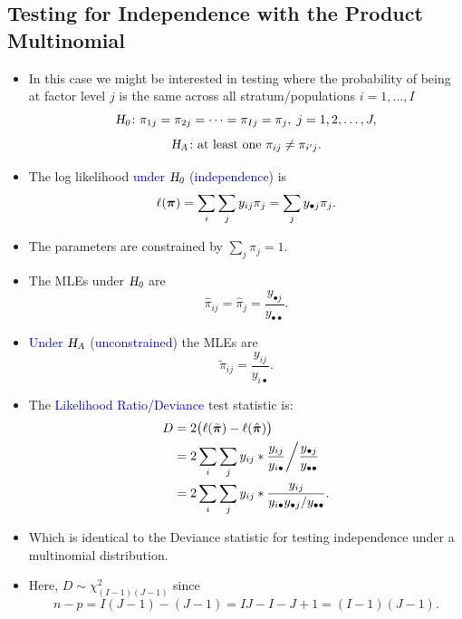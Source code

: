\documentclass{article}\usepackage[]{graphicx}\usepackage[svgnames]{xcolor}
\let\log\relax%
\newcommand{\HN}{\textsl{H}_{\textsl{0}}}%
\newcommand{\HA}{\textsl{H}_{\textsl{A}}}%
\providecommand{\Vector}[1]{\bm{#1}}%
\begin{document}
\subsection*{Testing for Independence with the Product Multinomial}
\begin{itemize}
      \item In this case we might be interested in testing where the probability of being at
            factor level $j$ is the same across all stratum/populations $ i=1,\ldots,I $
            \[ \HN\colon \pi_{1j}=\pi_{2j}=\cdots=\pi_{Ij}=\pi_j,\;j=1,2,\ldots,J, \]
            \[ \HA\colon \text{at least one }\pi_{ij}\ne \pi_{i^\prime j}. \]
      \item The log likelihood \textcolor{Blue}{under $ \HN $ (independence)} is
            \[ \ell(\Vector{\pi})=\sum_i\sum_j y_{ij}\log{\pi_{j}}=\sum_j y_{\bullet j}\log{\pi_{j}}. \]
      \item The parameters are constrained by $ \sum_{j}\pi_j=1 $.
      \item The MLEs under $ \HN $ are
            \[ \hat{\pi}_{ij}=\hat{\pi}_j=\frac{y_{\bullet j}}{y_{\bullet\bullet}}. \]
      \item \textcolor{Blue}{Under $ \HA $ (unconstrained)} the MLEs are
            \[ \tilde{\pi}_{ij}=\frac{y_{ij}}{y_{i\bullet}}. \]
      \item The \textcolor{Blue}{Likelihood Ratio/Deviance} test statistic is:
            \begin{align*}
                  D
                   & =2\bigl(\ell(\tilde{\Vector{\pi}})-\ell(\hat{\Vector{\pi}})\bigr)                                     \\
                   & =2\sum_i\sum_j y_{ij}\log*{\frac{y_{ij}}{y_{i\bullet}}\bigg/\frac{y_{\bullet j}}{y_{\bullet\bullet}}} \\
                   & =2\sum_i\sum_j y_{ij}\log*{\frac{y_{ij}}{y_{i\bullet}y_{\bullet j}/y_{\bullet\bullet}}}.
            \end{align*}
      \item Which is identical to the Deviance statistic for testing independence under a
            multinomial distribution.
      \item Here, $ D \sim \chi^2_{(I-1)(J-1)} $ since
            \[ n-p=I(J-1)-(J-1)=IJ-I-J+1=(I-1)(J-1). \]
\end{itemize}
\end{document}
